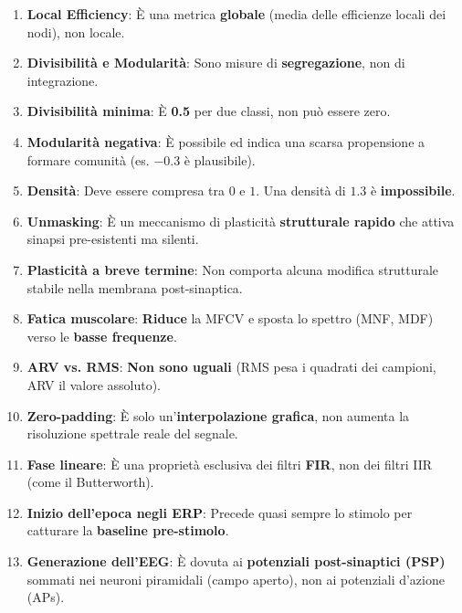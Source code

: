 \documentclass[10pt, letterpaper]{report}
\begin{document}
\begin{enumerate}
    \item \textbf{Local Efficiency}: È una metrica \textbf{globale} (media delle efficienze locali dei nodi), non locale.
    \item \textbf{Divisibilità e Modularità}: Sono misure di \textbf{segregazione}, non di integrazione.
    \item \textbf{Divisibilità minima}: È \textbf{0.5} per due classi, non può essere zero.
    \item \textbf{Modularità negativa}: È possibile ed indica una scarsa propensione a formare comunità (es. \(-0.3\) è plausibile).
    \item \textbf{Densità}: Deve essere compresa tra \(0\) e \(1\). Una densità di \(1.3\) è \textbf{impossibile}.
    \item \textbf{Unmasking}: È un meccanismo di plasticità \textbf{strutturale rapido} che attiva sinapsi pre-esistenti ma silenti.
    \item \textbf{Plasticità a breve termine}: Non comporta alcuna modifica strutturale stabile nella membrana post-sinaptica.
    \item \textbf{Fatica muscolare}: \textbf{Riduce} la MFCV e sposta lo spettro (MNF, MDF) verso le \textbf{basse frequenze}.
    \item \textbf{ARV vs. RMS}: \textbf{Non sono uguali} (RMS pesa i quadrati dei campioni, ARV il valore assoluto).
    \item \textbf{Zero-padding}: È solo un'\textbf{interpolazione grafica}, non aumenta la risoluzione spettrale reale del segnale.
    \item \textbf{Fase lineare}: È una proprietà esclusiva dei filtri \textbf{FIR}, non dei filtri IIR (come il Butterworth).
    \item \textbf{Inizio dell'epoca negli ERP}: Precede quasi sempre lo stimolo per catturare la \textbf{baseline pre-stimolo}.
    \item \textbf{Generazione dell'EEG}: È dovuta ai \textbf{potenziali post-sinaptici (PSP)} sommati nei neuroni piramidali (campo aperto), non ai potenziali d'azione (APs).
\end{enumerate}
\end{document}
